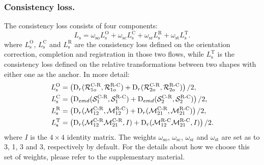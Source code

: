 \subsubsection{Consistency loss.}
The consistency loss consists of four components:
\begin{equation}
L_{\text{s}} = \omega_{\text{so}} L_{\text{s}}^{\text{O}} + \omega_{\text{sc}} L_{\text{s}}^{\text{C}}+ \omega_{\text{sr}} L_{\text{s}}^{\text{R}} + \omega_{\text{st}} L_{\text{s}}^{\text{T}}.
\end{equation}
where $L_{\text{s}}^{\text{O}}$, $L_{\text{s}}^{\text{C}}$ and $L_{\text{s}}^{\text{R}}$ are the consistency loss defined on the orientation correction, completion and registration in those two flows, while $L_{\text{s}}^{\text{T}}$ is the consistency loss defined on the relative transformations between two shapes with either one as the anchor. In more detail:
\begin{align}
L_{\text{s}}^{\text{O}} &= \left(\text{D}_r(\mathcal{R}_{1o}^{\text{C-R}}, \mathcal{R}_{1o}^{\text{R-C}}) + \text{D}_r(\mathcal{R}_{2o}^{\text{C-R}}, \mathcal{R}_{2o}^{\text{R-C}}) \right) / 2,
\notag \\ 
L_{\text{s}}^{\text{C}} &= \left(\text{D}_{emd}(\mathcal{S}_1^{\text{C-R}}, \mathcal{S}_1^{\text{R-C}}) + \text{D}_{emd}(\mathcal{S}_2^{\text{C-R}}, \mathcal{S}_2^{\text{R-C}}) \right) / 2,
\notag \\ 
L_{\text{s}}^{\text{R}} &= \left(\text{D}_r(\mathcal{M}_{12}^{\text{C-R}}, \mathcal{M}_{12}^{\text{R-C}}) + \text{D}_r(\mathcal{M}_{21}^{\text{C-R}}, \mathcal{M}_{21}^{\text{R-C}}) \right) / 2,
\notag \\ 
L_{\text{s}}^{\text{T}} &= \left(\text{D}_r(\mathcal{M}_{12}^{\text{C-R}}\mathcal{M}_{21}^{\text{C-R}}, I) + \text{D}_r(\mathcal{M}_{12}^{\text{R-C}}\mathcal{M}_{21}^{\text{R-C}}, I) \right) / 2.
\end{align}
where $I$ is the $4\times4$ identity matrix. The weights $\omega_{\text{so}} $, $\omega_{\text{sc}} $, $\omega_{\text{sr}}$ and $\omega_{\text{st}}$ are set as to 3, 1, 3 and 3, respectively by default. For the details about how we choose this set of weights, please refer to the supplementary material.

